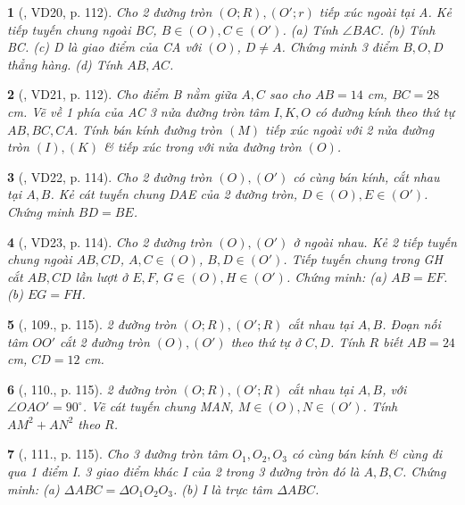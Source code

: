 \documentclass{article}
\newtheorem{baitoan}{}
\begin{document}
\begin{baitoan}[\cite{Binh_Toan_9_tap_1}, VD20, p. 112]
	Cho 2 đường tròn $(O;R),(O';r)$ tiếp xúc ngoài tại A. Kẻ tiếp tuyến chung ngoài BC, $B\in(O),C\in(O')$. (a) Tính $\angle{BAC}$. (b) Tính BC. (c) D là giao điểm của CA với $(O)$, $D\ne A$. Chứng minh 3 điểm $B,O,D$ thẳng hàng. (d) Tính $AB,AC$.
\end{baitoan}

\begin{baitoan}[\cite{Binh_Toan_9_tap_1}, VD21, p. 112]
	Cho điểm B nằm giữa $A,C$ sao cho $AB = 14$ {\rm cm}, $BC = 28$ {\rm cm}. Vẽ về 1 phía của AC 3 nửa đường tròn tâm $I,K,O$ có đường kính theo thứ tự $AB,BC,CA$. Tính bán kính đường tròn $(M)$ tiếp xúc ngoài với 2 nửa đường tròn $(I),(K)$ \& tiếp xúc trong với nửa đường tròn $(O)$.
\end{baitoan}

\begin{baitoan}[\cite{Binh_Toan_9_tap_1}, VD22, p. 114]
	Cho 2 đường tròn $(O),(O')$ có cùng bán kính, cắt nhau tại $A,B$. Kẻ cát tuyến chung DAE của 2 đường tròn, $D\in(O),E\in(O')$. Chứng minh $BD = BE$.
\end{baitoan}

\begin{baitoan}[\cite{Binh_Toan_9_tap_1}, VD23, p. 114]
	Cho 2 đường tròn $(O),(O')$ ở ngoài nhau. Kẻ 2 tiếp tuyến chung ngoài $AB,CD$, $A,C\in(O)$, $B,D\in(O')$. Tiếp tuyến chung trong GH cắt $AB,CD$ lần lượt ở $E,F$, $G\in(O),H\in(O')$. Chứng minh: (a) $AB = EF$. (b) $EG = FH$.
\end{baitoan}

\begin{baitoan}[\cite{Binh_Toan_9_tap_1}, 109., p. 115]
	2 đường tròn $(O;R),(O';R)$ cắt nhau tại $A,B$. Đoạn nối tâm $OO'$ cắt 2 đường tròn $(O),(O')$ theo thứ tự ở $C,D$. Tính $R$ biết $AB = 24$ {\rm cm}, $CD = 12$ {\rm cm}.
\end{baitoan}

\begin{baitoan}[\cite{Binh_Toan_9_tap_1}, 110., p. 115]
	2 đường tròn $(O;R),(O';R)$ cắt nhau tại $A,B$, với $\angle{OAO'} = 90^\circ$. Vẽ cát tuyến chung MAN, $M\in(O),N\in(O')$. Tính $AM^2 + AN^2$ theo $R$.
\end{baitoan}

\begin{baitoan}[\cite{Binh_Toan_9_tap_1}, 111., p. 115]
	Cho 3 đường tròn tâm $O_1,O_2,O_3$ có cùng bán kính \& cùng đi qua 1 điểm I. 3 giao điểm khác I của 2 trong 3 đường tròn đó là $A,B,C$. Chứng minh: (a) $\Delta ABC = \Delta O_1O_2O_3$. (b) I là trực tâm $\Delta ABC$.
\end{baitoan}
\end{document}
